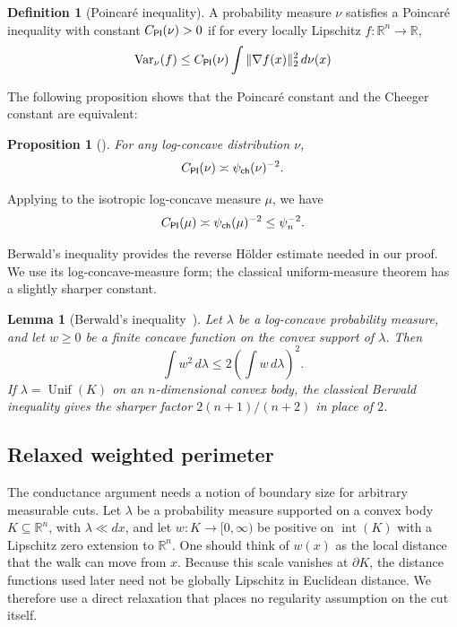 \documentclass[11pt]{article}
\newtheorem{proposition}[theorem]{Proposition}
\newtheorem{lemma}[theorem]{Lemma}
\theoremstyle{definition}
\newtheorem{definition}[theorem]{Definition}
\theoremstyle{remark}
\newcommand{\R}{\mathbb R}
\newcommand{\Unif}{\operatorname{Unif}}
\begin{document}
\begin{definition}[Poincar\'e inequality]
A probability measure $\nu$ satisfies a Poincar\'e inequality with constant \(C_{\sf PI}(\nu)>0\) if for every locally Lipschitz \(f:\R^n\to\R\),
\begin{equation}\label{eq:Poincare}
 \operatorname{Var}_\nu(f)
 \le
 C_{\sf PI}(\nu)
 \int\|\nabla f(x)\|_2^2\,d\nu(x)
\end{equation}
\end{definition}

The following proposition shows that the Poincar\'e constant and the Cheeger constant are equivalent:
\begin{proposition}[\cite{Cheeger,buser1982note,ledoux2004spectral}]
For any log-concave distribution $\nu$,
\begin{equation}\label{eq:Cheeger-Poincare}
 C_{\sf PI}(\nu)\asymp \psi_{\sf ch}(\nu)^{-2}.
\end{equation}
\end{proposition}
Applying to the isotropic log-concave measure \(\mu\), we have
\begin{equation}\label{eq:isotropic-Poincare}
 C_{\sf PI}(\mu)\asymp \psi_{\sf ch}(\mu)^{-2} \leq
 \psi_n^{-2}.
\end{equation}

Berwald's inequality provides the reverse H\"older estimate needed in our proof.  We use its log-concave-measure form; the classical uniform-measure theorem has a slightly sharper constant.

\begin{lemma}[Berwald's inequality~\cite{Berwald,LangharstPutterman}]\label{lem:berwald}
Let $\lambda$ be a log-concave probability measure, and let $w\ge0$ be a finite concave function on the convex support of $\lambda$.  Then
\begin{equation}\label{eq:Berwald-R}
 \int w^2\,d\lambda
 \le 2\left(\int w\,d\lambda\right)^2.
\end{equation}
If $\lambda=\Unif(K)$ on an $n$-dimensional convex body, the classical Berwald inequality gives the sharper factor $2(n+1)/(n+2)$ in place of $2$.
\end{lemma}

\subsection{Relaxed weighted perimeter}
\label{sec:relaxed-perimeter}

The conductance argument needs a notion of boundary size for arbitrary measurable cuts.  Let $\lambda$ be a probability measure supported on a convex body $K\subseteq\R^n$, with $\lambda\ll dx$, and let $w:K\to[0,\infty)$ be positive on $\operatorname{int}(K)$ with a Lipschitz zero extension to $\R^n$.  One should think of $w(x)$ as the local distance that the walk can move from $x$.  Because this scale vanishes at $\partial K$, the distance functions used later need not be globally Lipschitz in Euclidean distance.  We therefore use a direct relaxation that places no regularity assumption on the cut itself.
\end{document}
